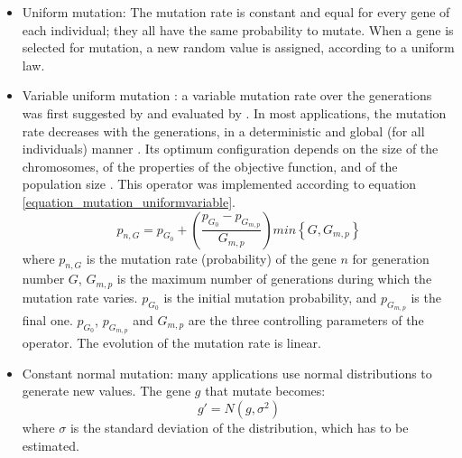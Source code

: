 \documentclass{ametsoc}
\begin{document}
\begin{itemize}
	\item Uniform mutation: The mutation rate is constant and equal for every gene of each individual; they all have the same probability to mutate. When a gene is selected for mutation, a new random value is assigned, according to a uniform law.
	
	\item Variable uniform mutation \citep{Fogarty1989}: a variable mutation rate over the generations was first suggested by \citet{Holland1992b} and evaluated by \citet{Fogarty1989}. In most applications, the mutation rate decreases with the generations, in a deterministic and global (for all individuals) manner \citep{Back1992b}. Its optimum configuration depends on the size of the chromosomes, of the properties of the objective function, and of the population size \citep{Back1992b}. This operator was implemented according to equation \ref{equation_mutation_uniformvariable}.
	\begin{equation}
	p_{n,G} = p_{G_{0}}+\left( \dfrac{p_{G_{0}}-p_{G_{m,p}}}{G_{m,p}} \right) min\left\lbrace G,G_{m,p}\right\rbrace 
	\label{equation_mutation_uniformvariable}
	\end{equation}
	where $p_{n,G}$ is the mutation rate (probability) of the gene $n$ for generation number $G$, $G_{m,p}$ is the maximum number of generations during which the mutation rate varies. $p_{G_{0}}$ is the initial mutation probability, and $p_{G_{m,p}}$ is the final one. $p_{G_{0}}$, $p_{G_{m,p}}$ and $G_{m,p}$ are the three controlling parameters of the operator. The evolution of the mutation rate is linear.
	
	\item Constant normal mutation: many applications use normal distributions to generate new values. The gene $g$ that mutate becomes:
	\begin{equation}
	g' = N(g,\sigma^{2})
	\label{equation_mutating_normal_distribution}
	\end{equation}
	where $\sigma$ is the standard deviation of the distribution, which has to be estimated.
	

\end{itemize}
\end{document}
